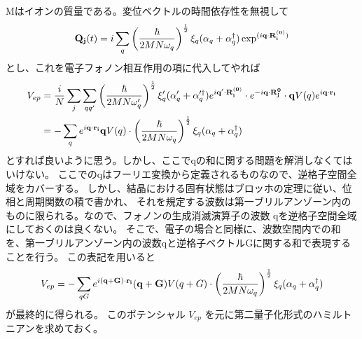 \documentclass[letterpaper,10pt,dvipdfmx]{sphinxhowto}
\begin{document}
Mはイオンの質量である。変位ベクトルの時間依存性を無視して
\begin{equation*}
\begin{split}\begin{aligned}
{\bf Q_j}(t)=i\sum_q \left(\frac{\hbar}{2MN\omega_q} \right)^\frac{1}{2} \xi_q
(\alpha_q +\alpha_q^\dagger )
\exp^{(i{\bf q\cdot R_i^{(0)}})}\end{aligned}\end{split}
\end{equation*}
とし、これを電子フォノン相互作用の項に代入してやれば
\begin{equation*}
\begin{split}\begin{aligned}
V_{ep}&=\frac{i}{N} \sum_j \sum_{qq'}
\left(\frac{\hbar}{2MN\omega_q'}\right)^\frac{1}{2} \xi_q' (\alpha_q' +\alpha_q'^\dagger ) e^{i{\bf q'\cdot R_i^{(0)}}} \cdot e^{-i{\bf q} \cdot {\bf
R_j^{0}}} \cdot  {\bf q}V(q)
e^{i {\bf q} \cdot{\bf r_i}}  \\
&=-\sum_{q}e^{i {\bf q} \cdot{\bf r_i}} {\bf q}V(q) \cdot
\left(\frac{\hbar}{2MN\omega_q} \right)^\frac{1}{2} \xi_q (\alpha_q +\alpha_q^\dagger )\end{aligned}\end{split}
\end{equation*}
とすれば良いように思う。しかし、ここでqの和に関する問題を解消しなくてはいけない。
ここでのqはフーリエ変換から定義されるものなので、逆格子空間全域をカバーする。
しかし、結晶における固有状態はブロッホの定理に従い、位相と周期関数の積で書かれ、
それを規定する波数は第一ブリルアンゾーン内のものに限られる。なので、フォノンの生成消滅演算子の波数
qを逆格子空間全域にしておくのは良くない。
そこで、電子の場合と同様に、波数空間内での和を、第一ブリルアンゾーン内の波数qと逆格子ベクトルGに関する和で表現することを行う。
この表記を用いると
\begin{equation*}
\begin{split}\begin{aligned}
V_{ep}=-\sum_{qG}e^{i {\bf (q+G)} \cdot{\bf r_i}} {\bf (q+G)}V(q+G) \cdot
\left(\frac{\hbar}{2MN\omega_q} \right)^\frac{1}{2} \xi_q (\alpha_q +\alpha_q^\dagger )
\end{aligned}\end{split}
\end{equation*}
が最終的に得られる。 このポテンシャル \(V_{ep}\) を元に第二量子化形式のハミルトニアンを求めておく。
\end{document}
